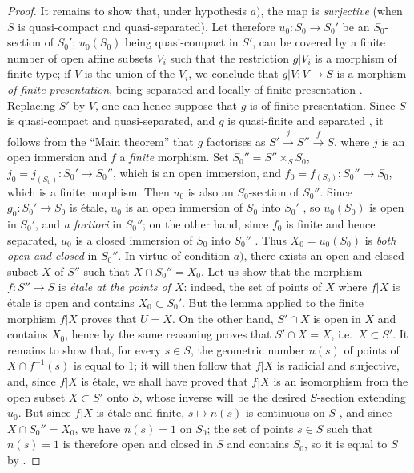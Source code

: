 \begin{proof}
It remains to show that, under hypothesis $a)$, the map  is \emph{surjective} (when $S$ is quasi-compact and quasi-separated).
Let therefore $u_0:S_0\to S_0'$ be an $S_0$-section of $S_0'$;
$u_0(S_0)$ being quasi-compact in $S'$, can be covered by a finite number of open affine subsets $V_i$ such that the restriction $g|V_i$ is a morphism of finite type;
if $V$ is the union of the $V_i$, we conclude that $g|V:V\to S$ is a morphism \emph{of finite presentation}, being separated and locally of finite presentation .
Replacing $S'$ by $V$, one can hence suppose that $g$ is of finite presentation.
Since $S$ is quasi-compact and quasi-separated, and $g$ is quasi-finite and separated , it follows from the ``Main theorem''  that $g$ factorises as $S'\xrightarrow{j}S''\xrightarrow{f}S$, where $j$ is an open immersion and $f$ a \emph{finite} morphism.
Set $S_0''=S''\times_S S_0$, $j_0=j_{(S_0)}:S_0'\to S_0''$, which is an open immersion, and $f_0=f_{(S_0)}:S_0''\to S_0$, which is a finite morphism.
Then $u_0$ is also an $S_0$-section of $S_0''$.
Since $g_0:S_0'\to S_0$ is \'etale, $u_0$ is an open immersion of $S_0$ into $S_0'$ , so $u_0(S_0)$ is open in $S_0'$, and \emph{a fortiori} in $S_0''$;
on the other hand, since $f_0$ is finite and hence separated, $u_0$ is a closed immersion of $S_0$ into $S_0''$ .
Thus $X_0=u_0(S_0)$ is \emph{both open and closed} in $S_0''$.
In virtue of condition $a)$, there exists an open and closed subset $X$ of $S''$ such that $X\cap S_0''=X_0$.
Let us show that the morphism $f:S''\to S$ is \emph{\'etale at the points of $X$}:
indeed, the set of points of $X$ where $f|X$ is \'etale is open and contains $X_0\subset S_0'$.
But the lemma  applied to the finite morphism $f|X$ proves that $U=X$.
On the other hand, $S'\cap X$ is open in $X$ and contains $X_0$, hence by the same reasoning proves that $S'\cap X=X$, i.e.\ $X\subset S'$.
It remains to show that, for every $s\in S$, the geometric number $n(s)$ of points of $X\cap f^{-1}(s)$ is equal to $1$;
it will then follow that $f|X$ is radicial and surjective, and, since $f|X$ is \'etale, we shall have proved  that $f|X$ is an isomorphism from the open subset $X\subset S'$ onto $S$, whose inverse will be the desired $S$-section extending $u_0$.
But since $f|X$ is \'etale and finite, $s\mapsto n(s)$ is continuous on $S$ , and since $X\cap S_0''=X_0$, we have $n(s)=1$ on $S_0$;
the set of points $s\in S$ such that $n(s)=1$ is therefore open and closed in $S$ and contains $S_0$, so it is equal to $S$ by .
\end{proof}

